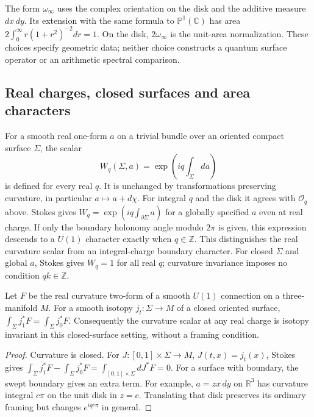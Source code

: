 The form \(\omega_\infty\) uses the complex orientation on the disk
and the additive measure \(dx\,dy\).
Its extension with the same formula to \(\mathbb P^1(\mathbb C)\)
has area \(2\int_0^\infty r(1+r^2)^{-2}dr=1\).
On the disk, \(2\omega_\infty\) is the unit-area normalization.
These choices specify geometric data; neither choice constructs a
quantum surface operator or an arithmetic spectral comparison.

\subsection{Real charges, closed surfaces and area characters}
\label{v4-arith:pres90:real-charge}

For a smooth real one-form $a$ on a trivial bundle over an oriented
compact surface $\Sigma$, the scalar
\[
 W_q(\Sigma,a)=\exp\left(iq\int_\Sigma da\right)
\]
is defined for every real $q$. It is unchanged by transformations
preserving curvature, in particular $a\mapsto a+d\chi$.
For integral $q$ and the disk it agrees with $\mathcal O_q$ above.
Stokes gives $W_q=\exp(iq\int_{\partial\Sigma}a)$ for a globally
specified $a$ even at real charge. If only the boundary holonomy
angle modulo $2\pi$ is given, this expression descends to a
$U(1)$ character exactly when $q\in\mathbb Z$. This distinguishes
the real curvature scalar from an integral-charge boundary character.
For closed $\Sigma$ and global $a$, Stokes gives $W_q=1$ for all
real $q$; curvature invariance imposes no condition $qk\in\mathbb Z$.

\begin{proposition}
\label{v4-arith:pres90:closed-isotopy}
Let $F$ be the real curvature two-form of a smooth $U(1)$ connection
on a three-manifold $M$. For a smooth isotopy $j_t:\Sigma\to M$ of
a closed oriented surface,
$\int_\Sigma j_1^*F=\int_\Sigma j_0^*F$.
Consequently the curvature scalar at any real charge is isotopy
invariant in this closed-surface setting, without a framing condition.
\end{proposition}
\begin{proof}
Curvature is closed. For $J:[0,1]\times\Sigma\to M$, $J(t,x)=j_t(x)$,
Stokes gives
$\int_\Sigma j_1^*F-\int_\Sigma j_0^*F
=\int_{[0,1]\times\Sigma}dJ^*F=0$.
For a surface with boundary, the swept boundary gives an extra term.
For example, $a=z x\,dy$ on $\mathbb R^3$ has curvature integral
$c\pi$ on the unit disk in $z=c$. Translating that disk preserves
its ordinary framing but changes $e^{iqc\pi}$ in general.
\end{proof}

